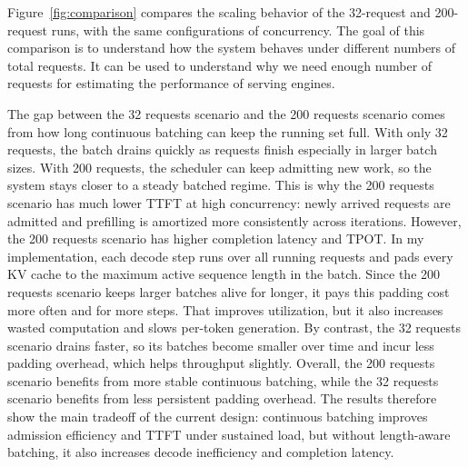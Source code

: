 \documentclass[11pt]{article}
\begin{document}
Figure~\ref{fig:comparison} compares the scaling behavior of the 32-request and 200-request runs, with the same configurations of concurrency. The goal of this comparison is to understand how the system behaves under different numbers of total requests. It can be used to understand why we need enough number of requests for estimating the performance of serving engines.

The gap between the 32 requests scenario and the 200 requests scenario comes from how long continuous batching can keep the running set full. 
With only 32 requests, the batch drains quickly as requests finish especially in larger batch sizes. 
With 200 requests, the scheduler can keep admitting new work, so the system stays closer to a steady batched regime. 
This is why the 200 requests scenario has much lower TTFT at high concurrency: newly arrived requests are admitted and prefilling is amortized more consistently across iterations. 
However, the 200 requests scenario has higher completion latency and TPOT. 
In my implementation, each decode step runs over all running requests and pads every KV cache to the maximum active sequence length in the batch. 
Since the 200 requests scenario keeps larger batches alive for longer, it pays this padding cost more often and for more steps. 
That improves utilization, but it also increases wasted computation and slows per-token generation. 
By contrast, the 32 requests scenario drains faster, so its batches become smaller over time and incur less padding overhead, which helps throughput slightly. 
Overall, the 200 requests scenario benefits from more stable continuous batching, while the 32 requests scenario benefits from less persistent padding overhead. 
The results therefore show the main tradeoff of the current design: continuous batching improves admission efficiency and TTFT under sustained load, but without length-aware batching, it also increases decode inefficiency and completion latency.

\end{document}
